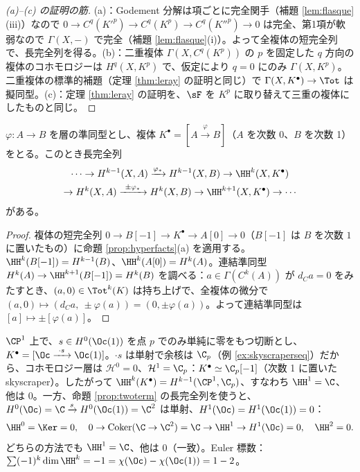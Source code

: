 \begin{proof}[(a)--(c) の証明の筋]
(a)：Godement 分解は項ごとに完全関手（補題 \ref{lem:flasque}(iii)）なので $0\to C^q(K'^p)\to C^q(K^p)\to C^q(K''^p)\to0$ は完全、第1項が軟弱なので $\Gamma(X,-)$ で完全（補題 \ref{lem:flasque}(i)）。よって全複体の短完全列で、長完全列を得る。(b)：二重複体 $\Gamma(X,C^q(K^p))$ の $p$ を固定した $q$ 方向の複体のコホモロジーは $H^q(X,K^p)$ で、仮定により $q=0$ にのみ $\Gamma(X,K^p)$。二重複体の標準的補題（定理 \ref{thm:leray} の証明と同じ）で $\Gamma(X,K^\bullet)\to\Tot$ は擬同型。(c)：定理 \ref{thm:leray} の証明を、$\sF$ を $K^p$ に取り替えて三重の複体にしたものと同じ。\qedhere
\end{proof}
\begin{prop}[2 項の複体の長完全列]\label{prop:twoterm}\tP
$\varphi:A\to B$ を層の準同型とし、複体 $K^\bullet=[A\xrightarrow{\varphi}B]$（$A$ を次数 0、$B$ を次数 1）をとる。このとき長完全列
\begin{multline*}
\cdots\to H^{k-1}(X,A)\xrightarrow{\varphi_*}H^{k-1}(X,B)\to\HH^k(X,K^\bullet)\\
\to H^k(X,A)\xrightarrow{\ \pm\varphi_*\ }H^k(X,B)\to\HH^{k+1}(X,K^\bullet)\to\cdots
\end{multline*}
がある。
\end{prop}
\begin{proof}
複体の短完全列 $0\to B[-1]\to K^\bullet\to A[0]\to0$（$B[-1]$ は $B$ を次数 $1$ に置いたもの）に命題 \ref{prop:hyperfacts}(a) を適用する。$\HH^k(B[-1])=H^{k-1}(B)$、$\HH^k(A[0])=H^k(A)$。連結準同型 $H^k(A)\to\HH^{k+1}(B[-1])=H^k(B)$ を調べる：$a\in\Gamma(C^k(A))$ が $d_Ca=0$ をみたすとき、$(a,0)\in\Tot^k(K)$ は持ち上げで、全複体の微分で $(a,0)\mapsto(d_Ca,\ \pm\varphi(a))=(0,\pm\varphi(a))$。よって連結準同型は $[a]\mapsto\pm[\varphi(a)]$。\qedhere
\end{proof}
\begin{ex}\label{ex:hyper1}\tP
$\CP^1$ 上で、$s\in H^0(\Oc(1))$ を点 $p$ でのみ単純に零をもつ切断とし、$K^\bullet=[\Oc\xrightarrow{\ \cdot s\ }\Oc(1)]$。$\cdot s$ は単射で余核は $\C_p$（例 \ref{ex:skyscraperseq}）だから、コホモロジー層は $\mathcal H^0=0$、$\mathcal H^1=\C_p$：$K^\bullet\simeq\C_p[-1]$（次数 1 に置いた skyscraper）。したがって $\HH^k(K^\bullet)=H^{k-1}(\CP^1,\C_p)$、すなわち $\HH^1=\C$、他は $0$。一方、命題 \ref{prop:twoterm} の長完全列を使うと、$H^0(\Oc)=\C\xrightarrow{s}H^0(\Oc(1))=\C^2$ は単射、$H^1(\Oc)=H^1(\Oc(1))=0$：
\[
\HH^0=\Ker=0,\quad 0\to\operatorname{Coker}(\C\to\C^2)=\C\to\HH^1\to H^1(\Oc)=0,\quad\HH^2=0.
\]
どちらの方法でも $\HH^1=\C$、他は $0$（一致）。Euler 標数：$\sum(-1)^k\dim\HH^k=-1=\chi(\Oc)-\chi(\Oc(1))=1-2$。
\end{ex}
